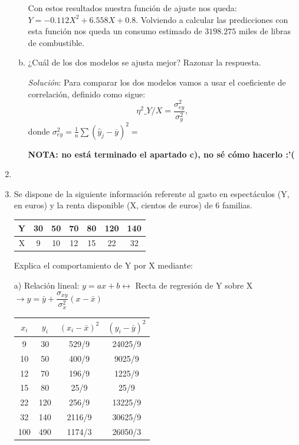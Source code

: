 \documentclass[10pt,a4paper]{article}
\begin{document}
\begin{enumerate}
\begin{enumerate}[a)]
Con estos resultados nuestra función de ajuste nos queda: \(Y = -0.112X^2 + 6.558X + 0.8\). Volviendo a calcular las predicciones con esta función nos queda un consumo estimado de \(3198.275\) miles de libras de combustible. 
\item ¿Cuál de los dos modelos se ajusta mejor? Razonar la respuesta.

\emph{Solución}: Para comparar los dos modelos vamos a usar el coeficiente de correlación, definido como sigue:
\[
\eta^2\_{Y/X}=\frac{\sigma_{ey}^2}{\sigma_y^2},
\]
donde \(\sigma_{ey}^2 = \frac{1}{n}\sum \left( \hat{y}_j-\overline{y}\right)^2=\)

\textbf{NOTA: no está terminado el apartado c), no sé cómo hacerlo :'(}
\end{enumerate}

\newpage
\item

\newpage
\item Se dispone de la siguiente información referente al gasto en espectáculos (Y, en euros) y la renta disponible (X, cientos de euros) de 6 familias.

\vspace{.25cm}
\begin{tabular}{|c|c|c|c|c|c|c|}
\hline 
Y & 30 & 50 & 70 & 80 & 120 & 140 \\ 
\hline 
X & 9 & 10 & 12 & 15 & 22 & 32 \\ 
\hline 
\end{tabular} 

\vspace{0.25cm}
Explica el comportamiento de Y por X mediante:

\hspace{0.5cm} a) Relación lineal: $y = ax + b \longleftrightarrow $ Recta de regresión de Y sobre X $\rightarrow y = \bar{y} + \dfrac{\sigma_{xy}}{\sigma_{x}^2} (x - \bar{x})$

\vspace{0.25cm}
\begin{center}
\begin{tabular}{|c|c|c|c|}
\hline 
$x_i$ & $y_i$ & $(x_i - \bar{x})^2$ & $(y_i - \bar{y})^2$ \\ 
\hline 
9 & 30 & 529/9 & 24025/9 \\ 
\hline 
10 & 50 & 400/9 & 9025/9 \\ 
\hline 
12 & 70 & 196/9 & 1225/9 \\ 
\hline 
15 & 80 & 25/9 & 25/9 \\ 
\hline 
22 & 120 & 256/9 & 13225/9 \\ 
\hline 
32 & 140 & 2116/9 & 30625/9 \\ 
\hline 
100 & 490 & 1174/3 & 26050/3 \\ 
\hline 
\end{tabular} 
\end{center}


\end{enumerate}
\end{document}
